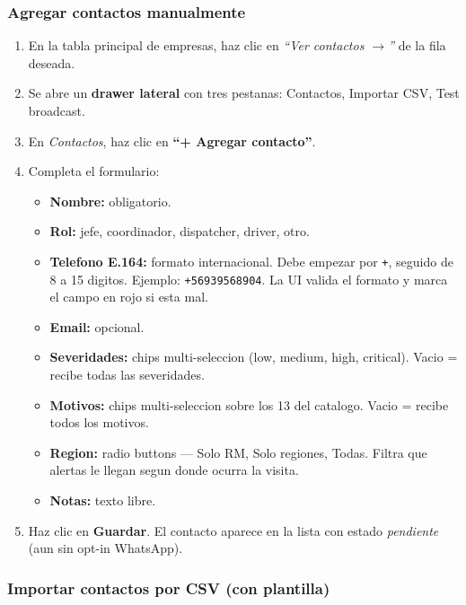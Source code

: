 \documentclass[11pt,a4paper]{article}
\begin{document}
\subsubsection{Agregar contactos manualmente}

\begin{enumerate}
  \item En la tabla principal de empresas, haz clic en
        \emph{``Ver contactos $\rightarrow$''} de la fila deseada.
  \item Se abre un \textbf{drawer lateral} con tres pestanas:
        Contactos, Importar CSV, Test broadcast.
  \item En \emph{Contactos}, haz clic en \textbf{``+ Agregar contacto''}.
  \item Completa el formulario:
    \begin{itemize}
      \item \textbf{Nombre:} obligatorio.
      \item \textbf{Rol:} jefe, coordinador, dispatcher, driver, otro.
      \item \textbf{Telefono E.164:} formato internacional. Debe
            empezar por \texttt{+}, seguido de 8 a 15 digitos.
            Ejemplo: \texttt{+56939568904}. La UI valida el formato y
            marca el campo en rojo si esta mal.
      \item \textbf{Email:} opcional.
      \item \textbf{Severidades:} chips multi-seleccion (low, medium,
            high, critical). Vacio = recibe todas las severidades.
      \item \textbf{Motivos:} chips multi-seleccion sobre los 13 del
            catalogo. Vacio = recibe todos los motivos.
      \item \textbf{Region:} radio buttons --- Solo RM, Solo regiones,
            Todas. Filtra que alertas le llegan segun donde ocurra la
            visita.
      \item \textbf{Notas:} texto libre.
    \end{itemize}
  \item Haz clic en \textbf{Guardar}. El contacto aparece en la lista
        con estado \emph{pendiente} (aun sin opt-in WhatsApp).
\end{enumerate}

\subsubsection{Importar contactos por CSV (con plantilla)}
\end{document}
